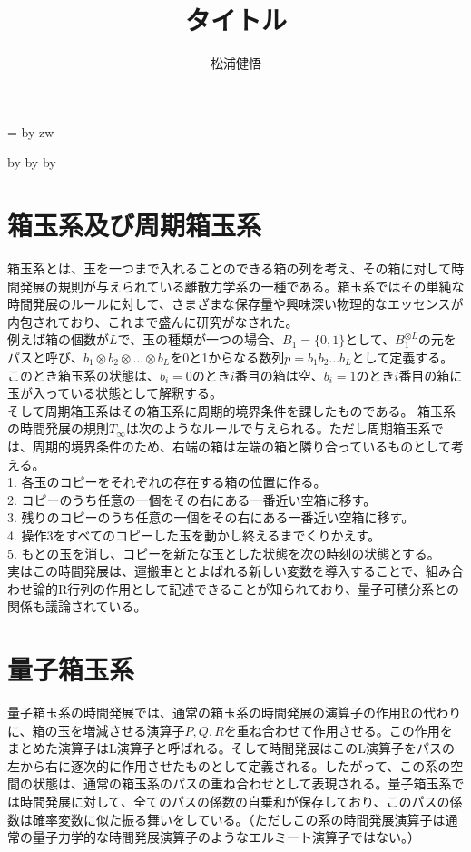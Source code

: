 \documentclass[10pt]{jarticle}
\title{\vspace{-2cm}タイトル}
\author{松浦健悟}
\date{}
\makeatletter
\def\mojiparline#1{
\newcounter{mpl}
\setcounter{mpl}{#1}
\@tempdima=\linewidth
\advance\@tempdima by-\value{mpl}zw
\addtocounter{mpl}{-1}
\divide\@tempdima by \value{mpl}
\advance\kanjiskip by\@tempdima
\advance\parindent by\@tempdima
}
\makeatother
\begin{document}
\mojiparline{50} %
\maketitle
\thispagestyle{empty}
\vspace{-2cm}

\section{箱玉系及び周期箱玉系}
箱玉系とは、玉を一つまで入れることのできる箱の列を考え、その箱に対して時間発展の規則が与えられている離散力学系の一種である。箱玉系ではその単純な時間発展のルールに対して、さまざまな保存量や興味深い物理的なエッセンスが内包されており、これまで盛んに研究がなされた。\\
例えば箱の個数が$L$で、玉の種類が一つの場合、$B_1 = \{ 0, 1\}$として、$B_1 ^ {\otimes L}$の元をパスと呼び、$b_1 \otimes b_2 \otimes ... \otimes b_L $を0と1からなる数列$p = b_1 b_2 ... b_L $として定義する。このとき箱玉系の状態は、$b_i = 0$のとき$i$番目の箱は空、$b_i = 1$のとき$i$番目の箱に玉が入っている状態として解釈する。\\そして周期箱玉系はその箱玉系に周期的境界条件を課したものである。
箱玉系の時間発展の規則$T_\infty$は次のようなルールで与えられる。ただし周期箱玉系では、周期的境界条件のため、右端の箱は左端の箱と隣り合っているものとして考える。\\
1. 各玉のコピーをそれぞれの存在する箱の位置に作る。\\  
2. コピーのうち任意の一個をその右にある一番近い空箱に移す。\\  
3. 残りのコピーのうち任意の一個をその右にある一番近い空箱に移す。\\  
4. 操作3をすべてのコピーした玉を動かし終えるまでくりかえす。\\  
5. もとの玉を消し、コピーを新たな玉とした状態を次の時刻の状態とする。\\  
実はこの時間発展は、運搬車ととよばれる新しい変数を導入することで、組み合わせ論的R行列の作用として記述できることが知られており、量子可積分系との関係も議論されている。\\

\vspace{-1cm}
\section{量子箱玉系}
量子箱玉系の時間発展では、通常の箱玉系の時間発展の演算子の作用Rの代わりに、箱の玉を増減させる演算子$P,Q,R$を重ね合わせて作用させる。この作用をまとめた演算子はL演算子と呼ばれる。そして時間発展はこのL演算子をパスの左から右に逐次的に作用させたものとして定義される。したがって、この系の空間の状態は、通常の箱玉系のパスの重ね合わせとして表現される。量子箱玉系では時間発展に対して、全てのパスの係数の自乗和が保存しており、このパスの係数は確率変数に似た振る舞いをしている。（ただしこの系の時間発展演算子は通常の量子力学的な時間発展演算子のようなエルミート演算子ではない。）
\end{document}
